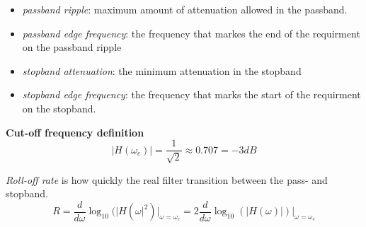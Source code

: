 \begin{multicols}{2}
\begin{itemize}
    \item \textit{passband ripple}: maximum amount of attenuation allowed in the passband.
    \item \textit{passband edge frequency}: the frequency that markes the end of the requirment on the passband ripple
    \item \textit{stopband attenuation}: the minimum attenuation in the stopband
    \item \textit{stopband edge frequency}: the frequency  that marks the start of the requirment on the stopband.
\end{itemize}

\textbf{Cut-off frequency definition}
\begin{equation*}
   |H(\omega_c)| = \frac{1}{\sqrt{2}} \approx 0.707 = -3dB
\end{equation*}


\textit{Roll-off rate} is how quickly the real filter transition between the pass- and stopband.
\begin{equation*}
    R=\frac{d}{d\omega}\log_10(|H(\omega|^2)\Big|_{\omega=\omega_c} = 2\frac{d}{d\omega}\log_10(|H(\omega)|)\Big|_{\omega=\omega_c}
\end{equation*}



\end{multicols}
